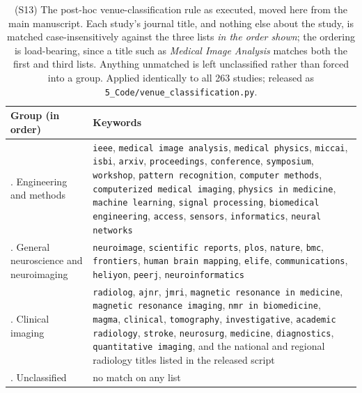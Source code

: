 \documentclass[11pt]{article}
\begin{document}
\begin{table}[t]
\centering
\caption{(S13) The post-hoc venue-classification rule as executed, moved here from the main
manuscript. Each study's journal title, and nothing else about the study, is matched
case-insensitively against the three lists \emph{in the order shown}; the ordering is
load-bearing, since a title such as \emph{Medical Image Analysis} matches both the first
and third lists. Anything unmatched is left unclassified rather than forced into a group.
Applied identically to all 263 studies; released as
\texttt{5\_Code/venue\_classification.py}.}
\label{tab:venue_rule}
\small
\begin{tabular}{>{\raggedright\arraybackslash}p{} >{\raggedright\arraybackslash}p{}}
\hline
\textbf{Group (in order)} & \textbf{Keywords} \\
\hline
1. Engineering and methods & \texttt{ieee}, \texttt{medical image analysis}, \texttt{medical physics}, \texttt{miccai}, \texttt{isbi}, \texttt{arxiv}, \texttt{proceedings}, \texttt{conference}, \texttt{symposium}, \texttt{workshop}, \texttt{pattern recognition}, \texttt{computer methods}, \texttt{computerized medical imaging}, \texttt{physics in medicine}, \texttt{machine learning}, \texttt{signal processing}, \texttt{biomedical engineering}, \texttt{access}, \texttt{sensors}, \texttt{informatics}, \texttt{neural networks} \\
\hline
2. General neuroscience and neuroimaging & \texttt{neuroimage}, \texttt{scientific reports}, \texttt{plos}, \texttt{nature}, \texttt{bmc}, \texttt{frontiers}, \texttt{human brain mapping}, \texttt{elife}, \texttt{communications}, \texttt{heliyon}, \texttt{peerj}, \texttt{neuroinformatics} \\
\hline
3. Clinical imaging & \texttt{radiolog}, \texttt{ajnr}, \texttt{jmri}, \texttt{magnetic resonance in medicine}, \texttt{magnetic resonance imaging}, \texttt{nmr in biomedicine}, \texttt{magma}, \texttt{clinical}, \texttt{tomography}, \texttt{investigative}, \texttt{academic radiology}, \texttt{stroke}, \texttt{neurosurg}, \texttt{medicine}, \texttt{diagnostics}, \texttt{quantitative imaging}, and the national and regional radiology titles listed in the released script \\
\hline
4. Unclassified & no match on any list \\
\hline
\end{tabular}
\end{table}
\end{document}
